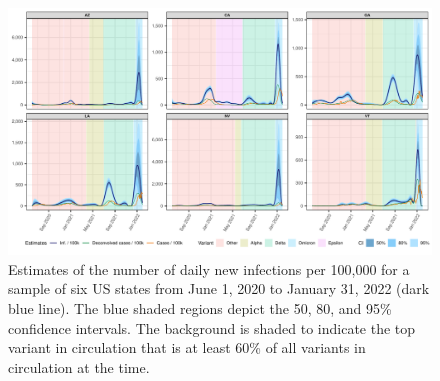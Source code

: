 \documentclass{article}
\begin{document}
\begin{figure}[!tb]
\centering
    \includegraphics[width=.9\linewidth]{state_niauc_est_6states.pdf}
    \caption{Estimates of the number of daily new infections per 100,000 for a
    sample of six US states from June 1, 2020 to January 31, 2022 (dark blue
    line). The blue shaded regions depict the 50, 80, and 95\% confidence
    intervals. The background is shaded to indicate the top variant in
    circulation that is at least 60\% of all variants in circulation at the
    time.}
    \label{fig:six_state_est}
\end{figure}
\end{document}
